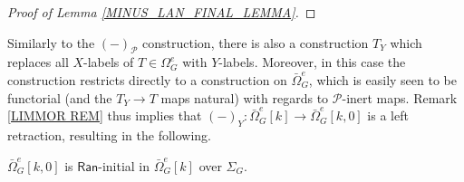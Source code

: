 \documentclass[a4paper,10pt]{article}%
\begin{document}
\begin{proof}[Proof of Lemma \ref{MINUS_LAN_FINAL_LEMMA}]
\end{proof}


Similarly to the $(\minus)_{\mathcal{P}}$ construction,
there is also a construction $T_Y$ which replaces all $X$-labels of $T \in \Omega_G^e$ with $Y$-labels. Moreover, in this case the construction restricts directly to a construction on 
$\bar{\Omega}_G^e$,
which is easily seen to be functorial (and the $T_Y \to T$ maps natural) with regards to $\mathcal{P}$-inert maps. Remark \ref{LIMMOR REM} thus implies that 
$(\minus)_Y \colon \bar{\Omega}_G^e[k] \to 
\bar{\Omega}_G^e[k,0]$
is a left retraction, 
resulting in the following.
\begin{lemma}
  \label{ZERO_LAN_FINALITY_LEMMA}
  $\bar{\Omega}_G^{e}[k,0]$ is $\mathsf{Ran}$-initial in $\bar{\Omega}_G^e[k]$ over $\Sigma_G$.
\end{lemma}
\end{document}
